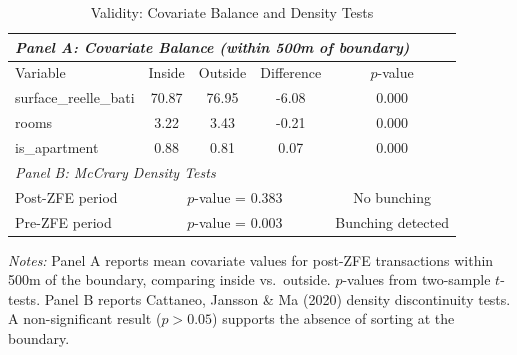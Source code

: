 \begin{table}[htbp]
\centering
\caption{Validity: Covariate Balance and Density Tests}
\label{tab:validity}
\begin{tabular}{lcccc}
\toprule
\multicolumn{5}{l}{\textit{Panel A: Covariate Balance (within 500m of boundary)}} \\
\midrule
Variable & Inside & Outside & Difference & $p$-value \\
\midrule
surface\_reelle\_bati & 70.87 & 76.95 & -6.08 & 0.000 \\
rooms & 3.22 & 3.43 & -0.21 & 0.000 \\
is\_apartment & 0.88 & 0.81 & 0.07 & 0.000 \\
\midrule
\multicolumn{5}{l}{\textit{Panel B: McCrary Density Tests}} \\
\midrule
Post-ZFE period & \multicolumn{3}{c}{$p$-value = 0.383} & No bunching \\
Pre-ZFE period & \multicolumn{3}{c}{$p$-value = 0.003} & Bunching detected \\
\bottomrule
\end{tabular}
\begin{tablenotes}[flushleft]\small
\item \textit{Notes:} Panel A reports mean covariate values for post-ZFE transactions within 500m of the boundary, comparing inside vs.\ outside. $p$-values from two-sample $t$-tests. Panel B reports Cattaneo, Jansson \& Ma (2020) density discontinuity tests. A non-significant result ($p > 0.05$) supports the absence of sorting at the boundary.
\end{tablenotes}
\end{table}

